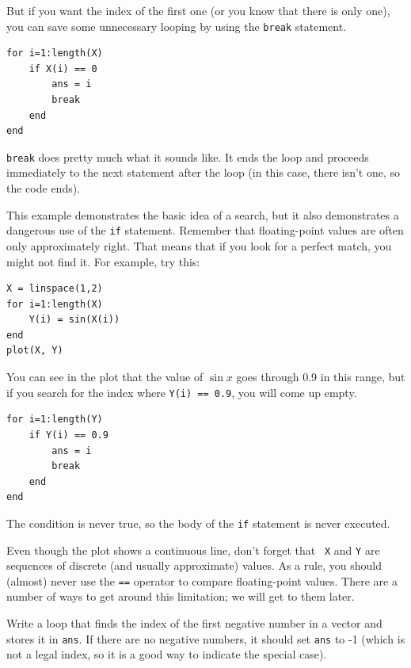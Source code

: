\documentclass[
]{book}
\begin{document}
But if you want the index of the first one (or you know that there
is only one), you can save some unnecessary looping by using the
{\tt break} statement.

\begin{verbatim}
for i=1:length(X)
    if X(i) == 0
        ans = i
        break
    end
end
\end{verbatim}

{\tt break} does pretty much what it sounds like.  It ends the
loop and proceeds immediately to the next statement after the
loop (in this case, there isn't one, so the code ends).

This example demonstrates the basic idea of a search, but it
also demonstrates a dangerous use of the {\tt if} statement.
Remember that floating-point values are often only approximately
right.  That means that if you look for a perfect match, you might
not find it.  For example, try this:

\begin{verbatim}
X = linspace(1,2)
for i=1:length(X)
    Y(i) = sin(X(i))
end
plot(X, Y)
\end{verbatim}

You can see in the plot that the value of $\sin x$ goes through
0.9 in this range, but if you search for the index where
{\tt Y(i) == 0.9}, you will come up empty.

\begin{verbatim}
for i=1:length(Y)
    if Y(i) == 0.9
        ans = i
        break
    end
end
\end{verbatim}

The condition is never true, so the body of the {\tt if} statement
is never executed.

Even though the plot shows a continuous line, don't forget that {\tt
X} and {\tt Y} are sequences of discrete (and usually approximate)
values.  As a rule, you should (almost) never use the {\tt ==}
operator to compare floating-point values.  There are a number of ways
to get around this limitation; we will get to them later.

\begin{ex}
Write a loop that finds the index of the first
negative number in a vector and stores it in {\tt ans}.  If there are
no negative numbers, it should set {\tt ans} to -1 (which is not
a legal index, so it is a good way to indicate the special case).
\end{ex}
\end{document}
